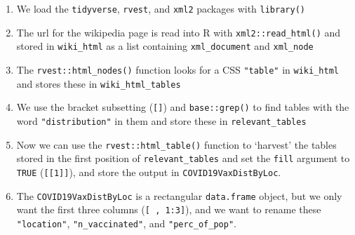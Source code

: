 \documentclass[11pt,]{article}
\def\tightlist{}
\begin{document}
\begin{enumerate}
\def\labelenumi{\arabic{enumi}.}
\tightlist
\item
  We load the \texttt{tidyverse}, \texttt{rvest}, and \texttt{xml2}
  packages with \texttt{library()}\\
\item
  The url for the wikipedia page is read into R with
  \texttt{xml2::read\_html()} and stored in \texttt{wiki\_html} as a
  list containing \texttt{xml\_document} and \texttt{xml\_node}\\
\item
  The \texttt{rvest::html\_nodes()} function looks for a CSS
  \texttt{"table"} in \texttt{wiki\_html} and stores these in
  \texttt{wiki\_html\_tables}\\
\item
  We use the bracket subsetting (\texttt{{[}{]}}) and
  \texttt{base::grep()} to find tables with the word
  \texttt{"distribution"} in them and store these in
  \texttt{relevant\_tables}
\item
  Now we can use the \texttt{rvest::html\_table()} function to `harvest'
  the tables stored in the first position of \texttt{relevant\_tables}
  and set the \texttt{fill} argument to \texttt{TRUE}
  (\texttt{{[}{[}1{]}{]}}), and store the output in
  \texttt{COVID19VaxDistByLoc}.
\item
  The \texttt{COVID19VaxDistByLoc} is a rectangular \texttt{data.frame}
  object, but we only want the first three columns
  (\texttt{{[}\ ,\ 1:3{]}}), and we want to rename these
  \texttt{"location"}, \texttt{"n\_vaccinated"}, and
  \texttt{"perc\_of\_pop"}.
\end{enumerate}
\end{document}
